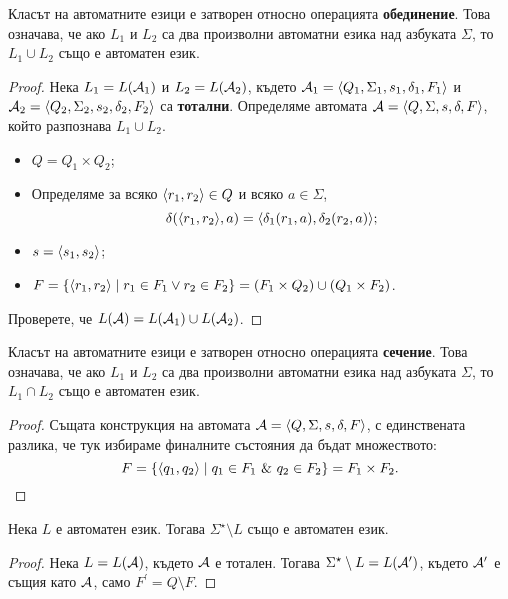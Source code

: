 \begin{prop}
  Класът на автоматните езици е затворен относно операцията {\bf обединение}.
  Това означава, че ако $L_1$ и $L_2$ са два произволни автоматни езика над азбуката $\Sigma$, то $L_1\cup L_2$
  също е автоматен език.
\end{prop}
\begin{proof}
  Нека $L_1 = L(\mathcal{A}_1)$ и $L_2 = L(\mathcal{A}_2)$, 
  където $\mathcal{A}_1 = \langle{Q_1,\Sigma_1,s_1,\delta_1,F_1}\rangle$ и $\mathcal{A}_2 = \langle{Q_2,\Sigma_2,s_2,\delta_2,F_2}\rangle$ са {\bf тотални}.
  Определяме автомата $\mathcal{A} = \langle{Q,\Sigma,s,\delta,F}\rangle$, който разпознава $L_1\cup L_2$.
  \begin{itemize}
  \item
    $Q = Q_1\times Q_2$;
  \item
    Определяме за всяко $\langle{r_1,r_2}\rangle \in Q$ и всяко $a \in \Sigma$,
    \[\delta(\langle{r_1,r_2}\rangle,a) = \langle{\delta_1(r_1,a),\delta_2(r_2,a)}\rangle;\]
  \item
    $s = \langle{s_1,s_2}\rangle$;
  \item
    $F = \{\langle{r_1,r_2}\rangle\mid r_1\in F_1\vee r_2 \in F_2\} = (F_1\times Q_2)\cup (Q_1\times F_2)$.
  \end{itemize}
  Проверете, че $L(\mathcal{A}) = L(\mathcal{A}_1)\cup L(\mathcal{A}_2)$.
\end{proof}

\begin{cor}
  Класът на автоматните езици е затворен относно операцията {\bf сечение}.
  Това означава, че ако $L_1$ и $L_2$ са два произволни автоматни езика над азбуката $\Sigma$, то $L_1\cap L_2$
  също е автоматен език.
\end{cor}
\begin{proof}
  Същата конструкция на автомата $\mathcal{A} = \langle{Q,\Sigma,s,\delta,F}\rangle$, 
  с единствената разлика, че тук избираме финалните състояния да бъдат множеството:
  \[F = \{\pair{q_1,q_2} \mid q_1 \in F_1\ \&\ q_2 \in F_2\} = F_1\times F_2.\]
\end{proof}

\begin{prop}
  Нека $L$ е автоматен език.
  Тогава $\Sigma^\star\setminus L$ също е автоматен език.
\end{prop}
\begin{proof}
  Нека $L = L(\mathcal{A})$, където $\mathcal{A}$ е тотален.
  Тогава $\Sigma^\star\setminus L = L(\mathcal{A}^\prime)$,
  където $\mathcal{A}^\prime$ е същия като $\mathcal{A}$, само $F^\prime = Q\setminus F$.
\end{proof}


